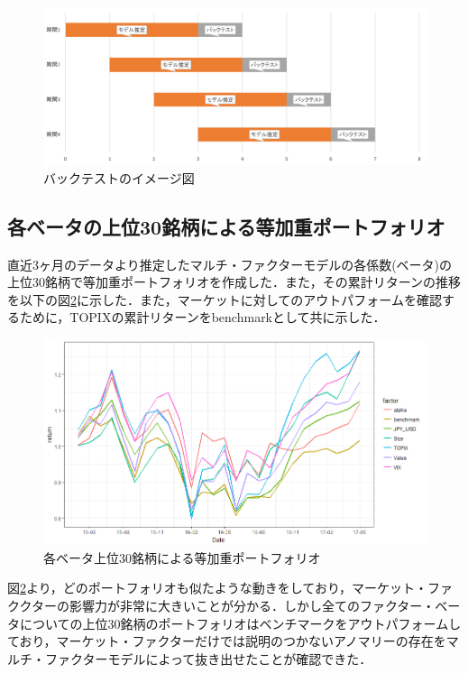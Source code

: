 ﻿\documentclass[11pt]{jreport}
\begin{document}
\begin{figure}[H]
	\begin{center}
		\includegraphics[width=15cm]{./fig/backtest.png}
		\caption{バックテストのイメージ図}
		\label{fig:backtest}
	\end{center}
\end{figure}

\subsection{各ベータの上位30銘柄による等加重ポートフォリオ}
直近3ヶ月のデータより推定したマルチ・ファクターモデルの各係数(ベータ)の上位30銘柄で等加重ポートフォリオを作成した．また，その累計リターンの推移を以下の図\ref{fig:factor_top30}に示した．また，マーケットに対してのアウトパフォームを確認するために，TOPIXの累計リターンをbenchmarkとして共に示した．


\begin{figure}[H]
	\begin{center}
		\includegraphics[width=15cm]{./fig/factor_top30.png}
		\caption{各ベータ上位30銘柄による等加重ポートフォリオ}
		\label{fig:factor_top30}
	\end{center}
\end{figure}


図\ref{fig:factor_top30}より，どのポートフォリオも似たような動きをしており，マーケット・ファククターの影響力が非常に大きいことが分かる．しかし全てのファクター・ベータについての上位30銘柄のポートフォリオはベンチマークをアウトパフォームしており，マーケット・ファクターだけでは説明のつかないアノマリーの存在をマルチ・ファクターモデルによって抜き出せたことが確認できた．
\end{document}
